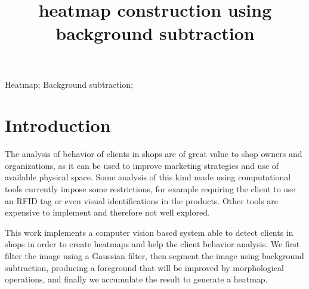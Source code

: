 \documentclass[10pt, conference]{IEEEtran}
\begin{document}
	
	\title{heatmap construction using background subtraction}
	
	\newif\iffinal
	\finaltrue
	\newcommand{\jemsid}{99999}
	\author{%
		\and
	}
	
	\maketitle
	
	\begin{abstract}
	\end{abstract}
	
	\begin{IEEEkeywords}
		Heatmap; Background subtraction;
		
	\end{IEEEkeywords}
	
	\IEEEpeerreviewmaketitle
	
	\section{Introduction}
	The analysis of behavior of clients in shops are of great value to shop owners and organizations, as it can be used to improve marketing strategies and use of available physical space. Some analysis of this kind made using computational tools currently impose some restrictions, for example requiring the client to use an RFID tag or even visual identifications in the products. Other tools are expensive to implement and therefore not well explored.
	
	This work implements a computer vision based system able to detect clients in shops in order to create heatmaps and help the client behavior analysis. We first filter the image using a Gaussian filter, then segment the image using background subtraction, producing a foreground that will be improved by morphological operations, and finally we accumulate the result to generate a heatmap.
	
\end{document}
